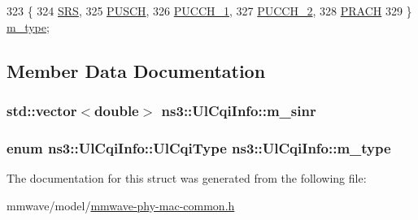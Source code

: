 \begin{DoxyCode}
323   \{
324     \hyperlink{structns3_1_1UlCqiInfo_a8241de30e4fdc8640e892ddf1e2a6c00ac5314dc3b681fe0d6f3f7c11c8fe1492}{SRS},
325     \hyperlink{structns3_1_1UlCqiInfo_a8241de30e4fdc8640e892ddf1e2a6c00a6d4b515df7c45a6843584459fbde26a7}{PUSCH},
326     \hyperlink{structns3_1_1UlCqiInfo_a8241de30e4fdc8640e892ddf1e2a6c00a804e5a286e4cb9382890b25b20b67be0}{PUCCH\_1},
327     \hyperlink{structns3_1_1UlCqiInfo_a8241de30e4fdc8640e892ddf1e2a6c00ac9ced142b5d32c08faee418ca1af07f4}{PUCCH\_2},
328     \hyperlink{structns3_1_1UlCqiInfo_a8241de30e4fdc8640e892ddf1e2a6c00ac9019920b00841bc946d27cb0d02d239}{PRACH}
329   \} \hyperlink{structns3_1_1UlCqiInfo_adadce315479d1bbf03550bf4799df6db}{m\_type};
\end{DoxyCode}


\subsection{Member Data Documentation}
\subsubsection[{\texorpdfstring{m\+\_\+sinr}{m_sinr}}]{\setlength{\rightskip}{0pt plus 5cm}std\+::vector$<$double$>$ ns3\+::\+Ul\+Cqi\+Info\+::m\+\_\+sinr}\hypertarget{structns3_1_1UlCqiInfo_ad9a153d49c1d34fb7cefb17da1d65152}{}\label{structns3_1_1UlCqiInfo_ad9a153d49c1d34fb7cefb17da1d65152}
\subsubsection[{\texorpdfstring{m\+\_\+type}{m_type}}]{\setlength{\rightskip}{0pt plus 5cm}enum {\bf ns3\+::\+Ul\+Cqi\+Info\+::\+Ul\+Cqi\+Type}  ns3\+::\+Ul\+Cqi\+Info\+::m\+\_\+type}\hypertarget{structns3_1_1UlCqiInfo_adadce315479d1bbf03550bf4799df6db}{}\label{structns3_1_1UlCqiInfo_adadce315479d1bbf03550bf4799df6db}


The documentation for this struct was generated from the following file\+:\begin{DoxyCompactItemize}
\item 
mmwave/model/\hyperlink{mmwave-phy-mac-common_8h}{mmwave-\/phy-\/mac-\/common.\+h}\end{DoxyCompactItemize}
